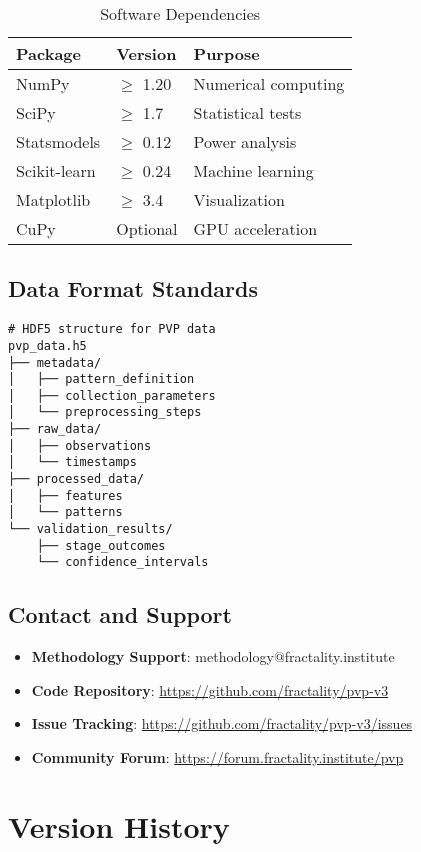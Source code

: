 \documentclass[12pt,oneside]{memoir}
\theoremstyle{plain}
\theoremstyle{definition}
\theoremstyle{remark}
\begin{document}
\begin{table}[h]
\centering
\caption{Software Dependencies}
\begin{tabular}{lll}
\toprule
\textbf{Package} & \textbf{Version} & \textbf{Purpose} \\
\midrule
NumPy & $\geq$ 1.20 & Numerical computing \\
SciPy & $\geq$ 1.7 & Statistical tests \\
Statsmodels & $\geq$ 0.12 & Power analysis \\
Scikit-learn & $\geq$ 0.24 & Machine learning \\
Matplotlib & $\geq$ 3.4 & Visualization \\
CuPy & Optional & GPU acceleration \\
\bottomrule
\end{tabular}
\end{table}

\section{Data Format Standards}

\begin{lstlisting}[caption={Standard Data Format}]
# HDF5 structure for PVP data
pvp_data.h5
├── metadata/
│   ├── pattern_definition
│   ├── collection_parameters
│   └── preprocessing_steps
├── raw_data/
│   ├── observations
│   └── timestamps
├── processed_data/
│   ├── features
│   └── patterns
└── validation_results/
    ├── stage_outcomes
    └── confidence_intervals
\end{lstlisting}

\section{Contact and Support}

\begin{itemize}
\item \textbf{Methodology Support}: methodology@fractality.institute
\item \textbf{Code Repository}: \url{https://github.com/fractality/pvp-v3}
\item \textbf{Issue Tracking}: \url{https://github.com/fractality/pvp-v3/issues}
\item \textbf{Community Forum}: \url{https://forum.fractality.institute/pvp}
\end{itemize}

\chapter{Version History}
\end{document}

